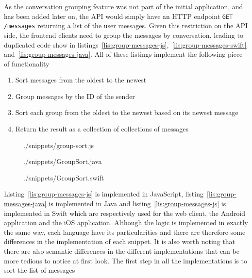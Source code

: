 As the conversation grouping feature was not part of the initial application,
and has been added later on, the API would simply have an HTTP endpoint
\lstinline{GET /messages} returning a list of the user messages. Given this
restriction on the API side, the frontend clients need to group the messages by
conversation, leading to duplicated code show in
listings~\ref{lis:group-messages-js},~\ref{lis:group-messages-swift}
and~\ref{lis:group-messages-java}. All of these listings implement the
following piece of functionality
\begin{enumerate}
\item Sort messages from the oldest to the newest
\item Group messages by the ID of the sender
\item Sort each group from the oldest to the newest based on its newest message
\item Return the result as a collection of collections of messages
\end{enumerate}
%
\begin{figure}
  
    {./snippets/group-sort.js}
\end{figure}
%
\begin{figure}
  
    {./snippets/GroupSort.java}
\end{figure}
%
\begin{figure}
  
    {./snippets/GroupSort.swift}
\end{figure}
%
Listing~\ref{lis:group-messages-js} is implemented in JavaScript,
listing~\ref{lis:group-messages-java} is implemented in Java and
listing~\ref{lis:group-messages-js} is implemented in Swift which are
respectively used for the web client, the Android application and the iOS
application. Although the logic is implemented in exactly the same way, each
language have its particularities and there are therefore some differences in
the implementation of each snippet. It is also worth noting that there are also
semantic differences in the different implementations that can be more tedious
to notice at first look.
The first step in all the implementations is to sort the list of messages
